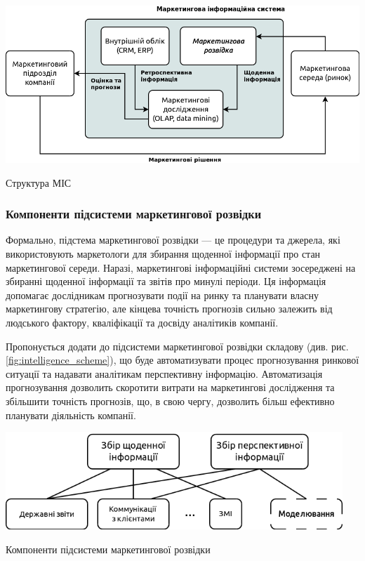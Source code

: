             \begin{stdfigure}
                \includegraphics[width=7in]{images/mis_structure.png}
                \caption{Структура МІС}
                \label{fig:mis_structure}
            \end{stdfigure}    
   
        \subsubsection{Компоненти підсистеми маркетингової розвідки}
Формально, підстема маркетингової розвідки --- це процедури та джерела, які використовують маркетологи для збирання щоденної інформації про стан маркетингової середи\cite{kotler14}. Наразі, маркетингові інформаційні системи зосереджені на збиранні щоденної інформації та звітів про минулі періоди. Ця інформація допомагає дослідникам прогнозувати події на ринку та планувати власну маркетингову стратегію, але кінцева точність прогнозів сильно залежить від людського фактору, кваліфікації та досвіду аналітиків компанії.
 
Пропонується додати до підсистеми маркетингової розвідки складову (див. рис. \ref{fig:intelligence_scheme}), що буде автоматизувати процес прогнозування ринкової ситуації та надавати аналітикам перспективну інформацію. Автоматизація прогнозування дозволить скоротити витрати на маркетингові дослідження та збільшити точність прогнозів, що, в свою чергу, дозволить більш ефективно планувати діяльність компанії.

            \begin{stdfigure}
                \includegraphics[width=5in]{images/intelligence_scheme.png}
                \caption{Компоненти підсистеми маркетингової розвідки}
                \label{fig:intelligence_scheme}
            \end{stdfigure}    
  
